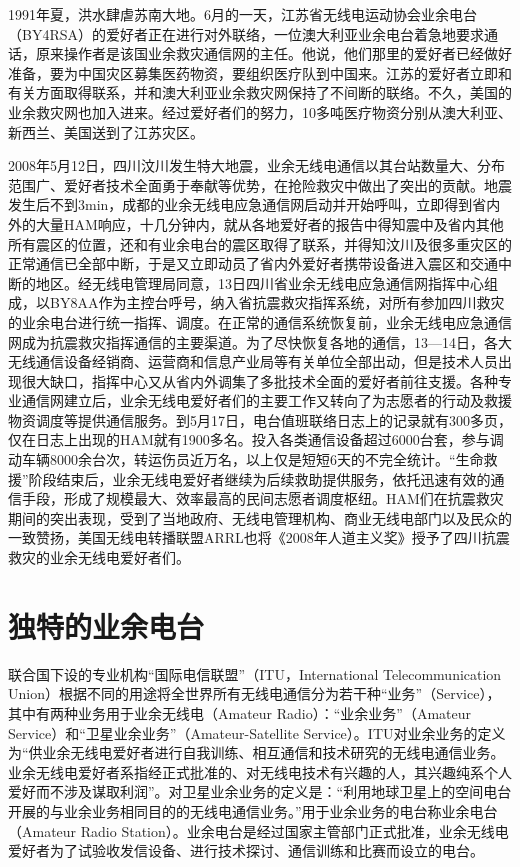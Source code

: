 \documentclass[12pt,UTF8]{ctexbook}
\begin{document}
1991年夏，洪水肆虐苏南大地。6月的一天，江苏省无线电运动协会业余电台（BY4RSA）的爱好者正在进行对外联络，一位澳大利亚业余电台着急地要求通话，原来操作者是该国业余救灾通信网的主任。他说，他们那里的爱好者已经做好准备，要为中国灾区募集医药物资，要组织医疗队到中国来。江苏的爱好者立即和有关方面取得联系，并和澳大利亚业余救灾网保持了不间断的联络。不久，美国的业余救灾网也加入进来。经过爱好者们的努力，10多吨医疗物资分别从澳大利亚、新西兰、美国送到了江苏灾区。

2008年5月12日，四川汶川发生特大地震，业余无线电通信以其台站数量大、分布范围广、爱好者技术全面勇于奉献等优势，在抢险救灾中做出了突出的贡献。地震发生后不到3min，成都的业余无线电应急通信网启动并开始呼叫，立即得到省内外的大量HAM响应，十几分钟内，就从各地爱好者的报告中得知震中及省内其他所有震区的位置，还和有业余电台的震区取得了联系，并得知汶川及很多重灾区的正常通信已全部中断，于是又立即动员了省内外爱好者携带设备进入震区和交通中断的地区。经无线电管理局同意，13日四川省业余无线电应急通信网指挥中心组成，以BY8AA作为主控台呼号，纳入省抗震救灾指挥系统，对所有参加四川救灾的业余电台进行统一指挥、调度。在正常的通信系统恢复前，业余无线电应急通信网成为抗震救灾指挥通信的主要渠道。为了尽快恢复各地的通信，13—14日，各大无线通信设备经销商、运营商和信息产业局等有关单位全部出动，但是技术人员出现很大缺口，指挥中心又从省内外调集了多批技术全面的爱好者前往支援。各种专业通信网建立后，业余无线电爱好者们的主要工作又转向了为志愿者的行动及救援物资调度等提供通信服务。到5月17日，电台值班联络日志上的记录就有300多页，仅在日志上出现的HAM就有1900多名。投入各类通信设备超过6000台套，参与调动车辆8000余台次，转运伤员近万名，以上仅是短短6天的不完全统计。“生命救援”阶段结束后，业余无线电爱好者继续为后续救助提供服务，依托迅速有效的通信手段，形成了规模最大、效率最高的民间志愿者调度枢纽。HAM们在抗震救灾期间的突出表现，受到了当地政府、无线电管理机构、商业无线电部门以及民众的一致赞扬，美国无线电转播联盟ARRL也将《2008年人道主义奖》授予了四川抗震救灾的业余无线电爱好者们。

\section{独特的业余电台}

联合国下设的专业机构“国际电信联盟”（ITU，International Telecommunication Union）根据不同的用途将全世界所有无线电通信分为若干种“业务”（Service），其中有两种业务用于业余无线电（Amateur Radio）：“业余业务”（Amateur Service）和“卫星业余业务”（Amateur-Satellite Service）。ITU对业余业务的定义为“供业余无线电爱好者进行自我训练、相互通信和技术研究的无线电通信业务。业余无线电爱好者系指经正式批准的、对无线电技术有兴趣的人，其兴趣纯系个人爱好而不涉及谋取利润”。对卫星业余业务的定义是：“利用地球卫星上的空间电台开展的与业余业务相同目的的无线电通信业务。”用于业余业务的电台称业余电台（Amateur Radio Station）。业余电台是经过国家主管部门正式批准，业余无线电爱好者为了试验收发信设备、进行技术探讨、通信训练和比赛而设立的电台。
\end{document}
